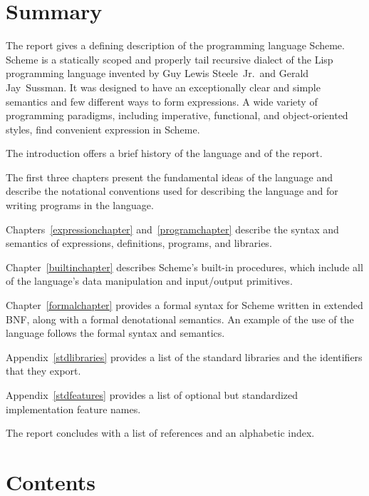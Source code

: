 \chapter*{Summary}

The report gives a defining description of the programming language
Scheme.  Scheme is a statically scoped and properly tail recursive
dialect of the Lisp programming language invented by Guy Lewis
Steele~Jr.\ and Gerald Jay~Sussman.  It was designed to have an
exceptionally clear and simple semantics and few different ways to
form expressions.  A wide variety of programming paradigms, including
imperative, functional, and object-oriented styles, find convenient
expression in Scheme.

\vest The introduction offers a brief history of the language and of
the report.

\vest The first three chapters present the fundamental ideas of the
language and describe the notational conventions used for describing the
language and for writing programs in the language.

\vest Chapters~\ref{expressionchapter} and~\ref{programchapter} describe
the syntax and semantics of expressions, definitions, programs, and libraries.

\vest Chapter~\ref{builtinchapter} describes Scheme's built-in
procedures, which include all of the language's data manipulation and
input/output primitives.

\vest Chapter~\ref{formalchapter} provides a formal syntax for Scheme
written in extended BNF, along with a formal denotational semantics.
An example of the use of the language follows the formal syntax and
semantics.

\vest Appendix~\ref{stdlibraries} provides a list of the standard libraries
and the identifiers that they export.

\vest Appendix~\ref{stdfeatures} provides a list of optional but standardized
implementation feature names.


\vest The report concludes with a list of references and an
alphabetic index.


\vfill
\eject

\chapter*{Contents}
\addvspace{3.5pt}                  %
\renewcommand{\tocshrink}{-3.5pt}  %
{\footnotesize
\tableofcontents
}

\vfill
\eject
